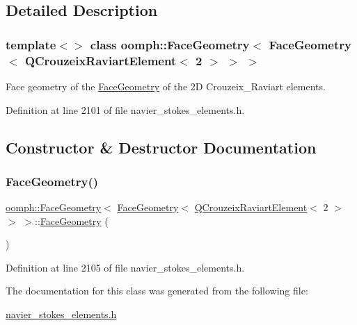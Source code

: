 \subsection{Detailed Description}
\subsubsection*{template$<$$>$\newline
class oomph\+::\+Face\+Geometry$<$ Face\+Geometry$<$ Q\+Crouzeix\+Raviart\+Element$<$ 2 $>$ $>$ $>$}

Face geometry of the \hyperlink{classoomph_1_1FaceGeometry}{Face\+Geometry} of the 2D Crouzeix\+\_\+\+Raviart elements. 

Definition at line 2101 of file navier\+\_\+stokes\+\_\+elements.\+h.



\subsection{Constructor \& Destructor Documentation}
\mbox{\label{classoomph_1_1FaceGeometry_3_01FaceGeometry_3_01QCrouzeixRaviartElement_3_012_01_4_01_4_01_4_a1068b29c8a6a4e3c0c842eaa578f221e}} 
\subsubsection{\texorpdfstring{Face\+Geometry()}{FaceGeometry()}}
{\footnotesize\ttfamily \hyperlink{classoomph_1_1FaceGeometry}{oomph\+::\+Face\+Geometry}$<$ \hyperlink{classoomph_1_1FaceGeometry}{Face\+Geometry}$<$ \hyperlink{classoomph_1_1QCrouzeixRaviartElement}{Q\+Crouzeix\+Raviart\+Element}$<$ 2 $>$ $>$ $>$\+::\hyperlink{classoomph_1_1FaceGeometry}{Face\+Geometry} (\begin{DoxyParamCaption}{ }\end{DoxyParamCaption})\hspace{0.3cm}{\ttfamily [inline]}}



Definition at line 2105 of file navier\+\_\+stokes\+\_\+elements.\+h.



The documentation for this class was generated from the following file\+:\begin{DoxyCompactItemize}
\item 
\hyperlink{navier__stokes__elements_8h}{navier\+\_\+stokes\+\_\+elements.\+h}\end{DoxyCompactItemize}
